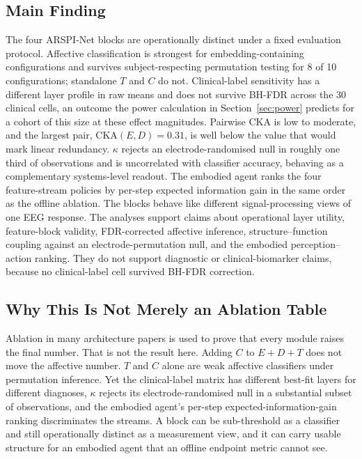 \documentclass[journal]{IEEEtran}
\begin{document}
\subsection{Main Finding}
The four ARSPI-Net blocks are operationally distinct under a fixed evaluation protocol. Affective classification is strongest for embedding-containing configurations and survives subject-respecting permutation testing for 8 of 10 configurations; standalone $T$ and $C$ do not. Clinical-label sensitivity has a different layer profile in raw means and does not survive BH-FDR across the 30 clinical cells, an outcome the power calculation in Section~\ref{sec:power} predicts for a cohort of this size at these effect magnitudes. Pairwise CKA is low to moderate, and the largest pair, $\mathrm{CKA}(E,D)=0.31$, is well below the value that would mark linear redundancy. $\kappa$ rejects an electrode-randomised null in roughly one third of observations and is uncorrelated with classifier accuracy, behaving as a complementary systems-level readout. The embodied agent ranks the four feature-stream policies by per-step expected information gain in the same order as the offline ablation. The blocks behave like different signal-processing views of one EEG response. The analyses support claims about operational layer utility, feature-block validity, FDR-corrected affective inference, structure--function coupling against an electrode-permutation null, and the embodied perception--action ranking. They do not support diagnostic or clinical-biomarker claims, because no clinical-label cell survived BH-FDR correction.

\subsection{Why This Is Not Merely an Ablation Table}
Ablation in many architecture papers is used to prove that every module raises the final number. That is not the result here. Adding $C$ to $E+D+T$ does not move the affective number. $T$ and $C$ alone are weak affective classifiers under permutation inference. Yet the clinical-label matrix has different best-fit layers for different diagnoses, $\kappa$ rejects its electrode-randomised null in a substantial subset of observations, and the embodied agent's per-step expected-information-gain ranking discriminates the streams. A block can be sub-threshold as a classifier and still operationally distinct as a measurement view, and it can carry usable structure for an embodied agent that an offline endpoint metric cannot see.
\end{document}
